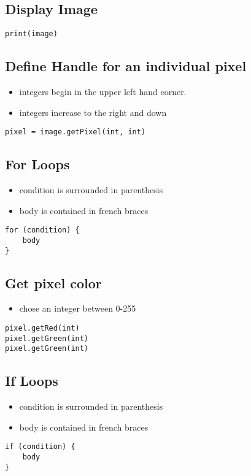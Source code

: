 \documentclass{article}
\begin{document}
\subsection{Display Image}
\begin{lstlisting}
print(image)
\end{lstlisting}

\subsection{Define Handle for an individual pixel}
    \begin{itemize}
      \item integers begin in the upper left hand corner.
      \item integers increase to the right and down
    \end{itemize}
\begin{lstlisting}
pixel = image.getPixel(int, int)
\end{lstlisting}

\subsection{For Loops}
\begin{itemize}
  \item condition is surrounded in parenthesis
  \item body is contained in french braces
\end{itemize}
\begin{lstlisting}
for (condition) {
    body
}
\end{lstlisting}

\subsection{Get pixel color}
\begin{itemize}
  \item chose an integer between 0-255
\end{itemize}

\begin{lstlisting}
pixel.getRed(int)
pixel.getGreen(int)
pixel.getGreen(int)
\end{lstlisting}

\subsection{If Loops}
\begin{itemize}
  \item condition is surrounded in parenthesis
  \item body is contained in french braces
\end{itemize}
\begin{lstlisting}
if (condition) {
    body
}
\end{lstlisting}
\end{document}
